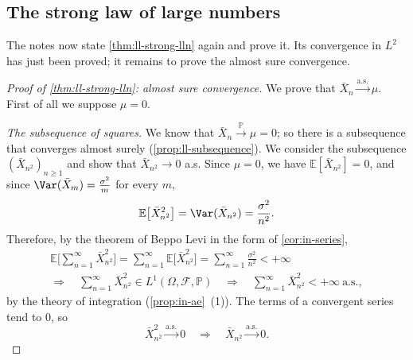\subsection{The strong law of large numbers}\label{sec:ll-strong}

The notes now state \cref{thm:ll-strong-lln} again and prove it. Its convergence in $L^2$ has
just been proved; it remains to prove the almost sure convergence.

\begin{proof}[Proof of \cref{thm:ll-strong-lln}: almost sure convergence]
We prove that $\bar X_n\xrightarrow{\text{a.s.}}\mu$. First of all we suppose $\mu=0$.

\emph{The subsequence of squares.} We know that $\bar X_n\xrightarrow{\mathbb P}\mu=0$; so there
is a subsequence that converges almost surely (\cref{prop:ll-subsequence}). We consider the
subsequence $(\bar X_{n^2})_{n\ge1}$ and show that $\bar X_{n^2}\to0$ a.s. Since $\mu=0$, we have
$\mathbb E[\bar X_{n^2}]=0$, and since $\Var(\bar X_m)=\frac{\sigma^2}m$ for every $m$,
\[
  \mathbb E\big[\bar X_{n^2}^2\big]=\Var(\bar X_{n^2})=\frac{\sigma^2}{n^2} .
\]
Therefore, by the theorem of Beppo Levi in the form of \cref{cor:in-series},
\[
\begin{gathered}
  \mathbb E\Big[\sum_{n=1}^\infty\bar X_{n^2}^2\Big]=\sum_{n=1}^\infty\mathbb E\big[\bar X_{n^2}^2\big]
  =\sum_{n=1}^\infty\frac{\sigma^2}{n^2}<+\infty\\
  \Longrightarrow\quad\sum_{n=1}^\infty\bar X_{n^2}^2\in L^1(\Omega,\mathcal F,\mathbb P)
  \quad\Longrightarrow\quad\sum_{n=1}^\infty\bar X_{n^2}^2<+\infty\ \text{a.s.},
\end{gathered}
\]
by the theory of integration (\cref{prop:in-ae}~(1)). The terms of a convergent series tend to
$0$, so
\[
  \bar X_{n^2}^2\xrightarrow{\text{a.s.}}0\quad\Longrightarrow\quad\bar X_{n^2}\xrightarrow{\text{a.s.}}0 .
\]


\end{proof}
